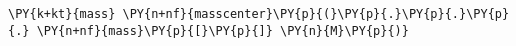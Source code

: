 \begin{Verbatim}[commandchars=\\\{\}]
    \PY{k+kt}{mass} \PY{n+nf}{masscenter}\PY{p}{(}\PY{p}{.}\PY{p}{.}\PY{p}{.} \PY{n+nf}{mass}\PY{p}{[}\PY{p}{]} \PY{n}{M}\PY{p}{)}
\end{Verbatim}
